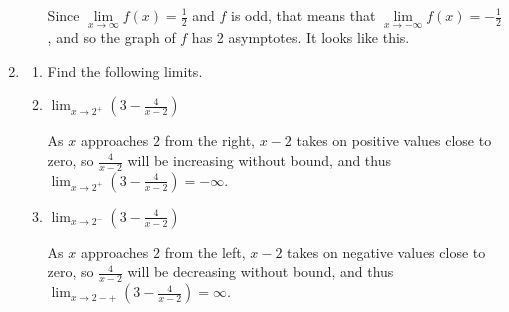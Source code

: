 \documentclass{article}
\newenvironment{enumeratecols}[2][]
{\NumTabs{#2}%
  \begin{enumerate*}[%
    itemjoin={\tab},#1]}%
  {\end{enumerate*}}
\begin{document}
\begin{enumerate}
\begin{enumerate}
    \begin{solution}
      Since $\lim\limits_{x \to \infty} f(x) = \frac{1}{2}$ and $f$ is odd, that means that
      $\lim\limits_{x \to -\infty} f(x) = -\frac{1}{2}$, and so the graph of $f$ has 2 asymptotes. It looks
      like this.

    \end{solution}

  \end{enumerate}

\item 

  \begin{enumerate}
  \item Find the following limits.

    \probonly{\begin{enumeratecols}{3}}
    \item
      \begin{problem}
        $\displaystyle \lim_{x \to 2^+} \left( 3 - \frac{4}{x - 2} \right)$
      \end{problem}

      \begin{solution}
        As $x$ approaches $2$ from the right, $x-2$ takes on positive values close to zero,
        so $\frac{4}{x-2}$ will be increasing without bound, and thus 
        $\displaystyle \lim_{x \to 2^+} \left( 3 - \frac{4}{x - 2} \right) = -\infty$.
      \end{solution}

    \item
      \begin{problem}
        $\displaystyle \lim_{x \to 2^-} \left( 3 - \frac{4}{x - 2} \right)$
      \end{problem}

      \begin{solution}
        As $x$ approaches $2$ from the left, $x-2$ takes on negative values close to zero,
        so $\frac{4}{x-2}$ will be decreasing without bound, and thus 
        $\displaystyle \lim_{x \to 2-+} \left( 3 - \frac{4}{x - 2} \right) = \infty$.
      \end{solution}


\end{enumerate}
\end{enumerate}
\end{document}
